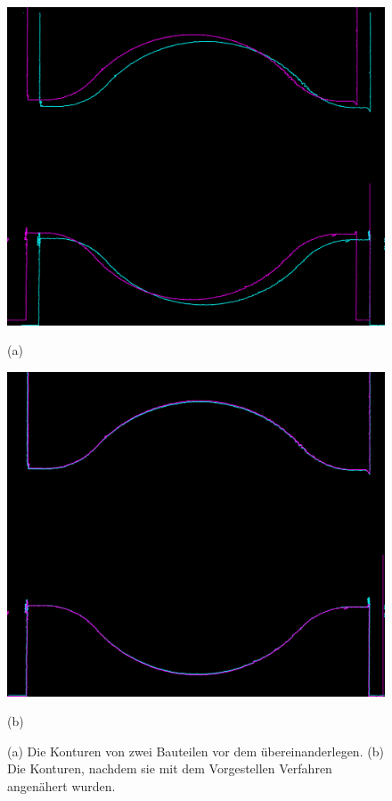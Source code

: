 \begin{figure}[H]
    \centering
    \begin{minipage}{0.49\textwidth}
        \centering
        \includegraphics[width=\textwidth]{images/contours_before_matching2.png} %
        \caption*{(a)} 
    \end{minipage}\hfill
    \begin{minipage}{0.49\textwidth}
        \centering
        \includegraphics[width=\textwidth]{images/contours_matching_13.png} %
        \caption*{(b)}
    \end{minipage}\hfill
    \caption{(a) Die Konturen von zwei Bauteilen vor dem übereinanderlegen. 
    (b) Die Konturen, nachdem sie mit dem Vorgestellen Verfahren angenähert wurden.}
        \label{fig:stichted_contours_compare}
\end{figure}

